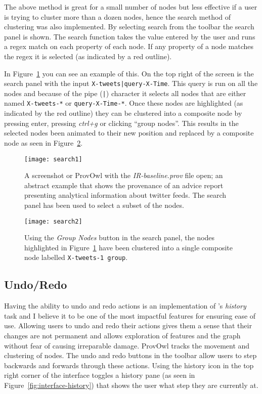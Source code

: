 The above method is great for a small number of nodes but less effective if a user is trying to cluster more than a dozen nodes, hence the search method of clustering was also implemented. By selecting search from the toolbar the search panel is shown. The search function takes the value entered by the user and runs a regex match on each property of each node. If any property of a node matches the regex it is selected (as indicated by a red outline).

In Figure~\ref{fig:search1} you can see an example of this. On the top right of the screen is the search panel with the input \texttt{X-tweets|query-X-Time}. This query is run on all the nodes and because of the pipe (\texttt{|}) character it selects all nodes that are either named \texttt{X-tweets-*} or \texttt{query-X-Time-*}. Once these nodes are highlighted (as indicated by the red outline) they can be clustered into a composite node by pressing enter, pressing \textit{ctrl+g} or clicking ``group nodes''. This results in the selected nodes been animated to their new position and replaced by a composite node as seen in Figure~\ref{fig:search2}.

\begin{figure}[h]
	\centering
	\texttt{[image: search1]}
	\caption{A screenshot or ProvOwl with the \textit{IR-baseline.prov} file open; an abstract example that shows the provenance of an advice report presenting analytical information about twitter feeds. The search panel has been used to select a subset of the nodes.}
	\label{fig:search1}
\end{figure}
\begin{figure}[h]
	\centering
	\texttt{[image: search2]}
	\caption{Using the \textit{Group Nodes} button in the search panel, the nodes highlighted in Figure~\ref{fig:search1} have been clustered into a single composite node labelled \texttt{X-tweets-1 group}.}
	\label{fig:search2}
\end{figure}

\clearpage

\subsection{Undo/Redo}
\label{sec:history}

Having the ability to undo and redo actions is an implementation of \citeauthor{Shneiderman1996}'s \textit{history} task and I believe it to be one of the most impactful features for ensuring ease of use. Allowing users to undo and redo their actions gives them a sense that their changes are not permanent and allows exploration of features and the graph without fear of causing irreparable damage. ProvOwl tracks the movement and clustering of nodes. The undo and redo buttons in the toolbar allow users to step backwards and forwards through these actions. Using the history icon in the top right corner of the interface toggles a history pane (as seen in Figure~\ref{fig:interface-history}) that shows the user what step they are currently at. 

